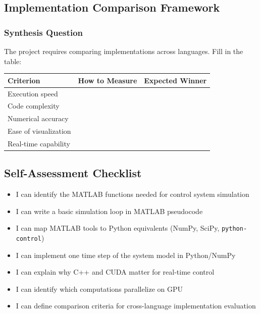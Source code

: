 \begin{answerbox}\end{answerbox}

\subsection{Implementation Comparison Framework}

\subsubsection*{Synthesis Question}

The project requires comparing implementations across languages. Fill in the table:

\medskip
\begin{tabularx}{\textwidth}{l X X}
\toprule
\textbf{Criterion} & \textbf{How to Measure} & \textbf{Expected Winner} \\
\midrule
Execution speed        & & \\[0.8em]
Code complexity        & & \\[0.8em]
Numerical accuracy     & & \\[0.8em]
Ease of visualization  & & \\[0.8em]
Real-time capability   & & \\
\bottomrule
\end{tabularx}

\begin{answerbox}\end{answerbox}

\subsection*{Self-Assessment Checklist}

\begin{itemize}[leftmargin=2em, label=$\square$]
  \item I can identify the MATLAB functions needed for control system simulation
  \item I can write a basic simulation loop in MATLAB pseudocode
  \item I can map MATLAB tools to Python equivalents (NumPy, SciPy, \texttt{python-control})
  \item I can implement one time step of the system model in Python/NumPy
  \item I can explain why C++ and CUDA matter for real-time control
  \item I can identify which computations parallelize on GPU
  \item I can define comparison criteria for cross-language implementation evaluation
\end{itemize}

\begin{notesbox}\end{notesbox}
